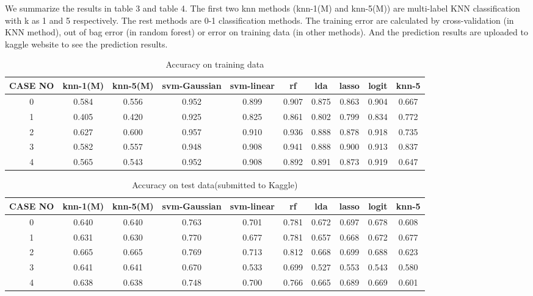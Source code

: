 \documentclass[11pt,letterpaper]{article}
\begin{document}
We summarize the results in table 3 and table 4. The first two knn methods (knn-1(M) and knn-5(M)) are multi-label KNN classification with k as 1 and 5 respectively. The rest methods are 0-1 classification methods. The training error are calculated by cross-validation (in KNN method), out of bag error (in random forest) or error on training data (in other methods). And the prediction results are uploaded to kaggle website to see the prediction results. 


	\begin{table}
	\centering
	\caption{Accuracy on training data}
	\begin{tabular}{|c|c|c|c|c|c|c|c|c|c|}
	\hline
	CASE NO	& knn-1(M)	& knn-5(M)	& svm-Gaussian & svm-linear & rf	& lda	& lasso &	logit	& knn-5 \\ \hline
0	& 0.584	 & 0.556	& 0.952 &	0.899	& 0.907	& 0.875 &	0.863	& 0.904 & 0.667 \\ \hline
1	& 0.405	 & 0.420	& 0.925	& 0.825	& 0.861	& 0.802	& 0.799	& 0.834	& 0.772 \\ \hline
2	& 0.627	& 0.600	& 0.957	& 0.910	& 0.936	& 0.888	& 0.878	& 0.918	& 0.735 \\ \hline
3	& 0.582	& 0.557	& 0.948	& 0.908	& 0.941	& 0.888	& 0.900	& 0.913	& 0.837 \\ \hline
4	& 0.565	& 0.543	& 0.952	& 0.908	& 0.892	& 0.891	& 0.873	& 0.919	& 0.647 \\ \hline
	\end{tabular}
	\end{table}

	\begin{table}
	\centering
	\caption{Accuracy on test data(submitted to Kaggle)}
	\begin{tabular}{|c|c|c|c|c|c|c|c|c|c|}
	\hline
	CASE NO	& knn-1(M)	& knn-5(M)	& svm-Gaussian & svm-linear	& rf	& lda	& lasso &	logit	& knn-5 \\ \hline
0	& 0.640 & 0.640	& 0.763 &	0.701	& 0.781	& 0.672 &	0.697	& 0.678 & 0.608 \\ \hline
1	& 0.631	 & 0.630	& 0.770	& 0.677	& 0.781	& 0.657	& 0.668	& 0.672	& 0.677 \\ \hline
2	& 0.665 & 0.665	& 0.769	& 0.713	& 0.812	& 0.668	& 0.699	& 0.688	& 0.623 \\ \hline
3	& 0.641	& 0.641	& 0.670	& 0.533	& 0.699	& 0.527	& 0.553	& 0.543	& 0.580 \\ \hline
4	& 0.638	& 0.638	& 0.748	& 0.700	& 0.766	& 0.665	& 0.689	& 0.669	& 0.601 \\ \hline
	\end{tabular}
	\end{table}
\end{document}
